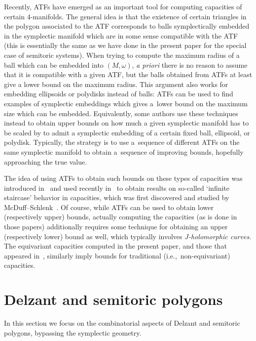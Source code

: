 \documentclass[10pt,a4paper]{amsart}
\numberwithin{equation}{section}
\newcommand{\om}{\omega}
\theoremstyle{definition}
\theoremstyle{plain}
\theoremstyle{plain}
\begin{document}
Recently, ATFs have emerged as an important tool for computing capacities of certain 4-manifolds. The general idea is that the existence of certain triangles in the polygon associated to the ATF corresponds to balls symplectically embedded in the symplectic manifold which are in some sense compatible with the ATF (this is essentially the same as we have done in the present paper for the special case of semitoric systems).
When trying to compute the maximum radius of a ball which can be embedded into $(M,\om)$, \emph{a priori} there is no reason to assume that it is compatible with a given ATF, but the balls obtained from ATFs at least give a lower bound on the maximum radius.
This argument also works for embedding ellipsoids or polydisks instead of balls: ATFs can be used to find examples of symplectic embeddings which gives a~lower bound on the maximum size which can be embedded.
Equivalently, some authors use these techniques instead to obtain upper bounds on how much a given symplectic manifold has to be scaled by to admit a symplectic embedding of a certain fixed ball, ellipsoid, or polydisk.
Typically, the strategy is to use a~sequence of different ATFs on the same symplectic manifold to obtain a~sequence of improving bounds, hopefully approaching the true value.

The idea of using ATFs to obtain such bounds on these types of capacities was introduced in~\cite{CV,CGHMP} and used recently in~\cite{four-periodic,macgill,MMW-staircasepatterns} to obtain results on so-called `infinite staircase' behavior in capacities, which was first discovered and studied by McDuff--Schlenk~\cite{MS12}. Of course, while ATFs can be used to obtain lower (respectively upper) bounds, actually computing the capacities (as is done in those papers) additionally requires some technique for obtaining an upper (respectively lower) bound as well, which typically involves \emph{$J$-holomorphic curves}.
The equivariant capacities computed in the present paper, and those that appeared in~\cite{FiPaPe2016}, similarly imply bounds for traditional (i.e.,~non-equivariant) capacities.


\section{Delzant and semitoric polygons}
\label{sec:polygons-intro}

In this section we focus on the combinatorial aspects of Delzant and semitoric polygons, bypassing the symplectic geometry.
\end{document}
